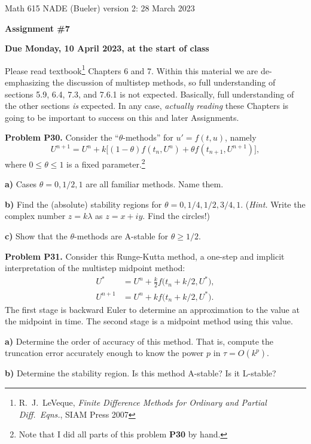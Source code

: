 \documentclass[12pt]{amsart}
\newcommand{\prob}[1]{\bigskip\noindent\textbf{#1}\quad }
\newcommand{\epart}[1]{\medskip\noindent\textbf{#1)}\quad }
\begin{document}
\scriptsize \noindent Math 615 NADE (Bueler) \hfill version 2: 28 March 2023
\normalsize

\medskip\bigskip

\Large\centerline{\textbf{Assignment \#7}}
\large
\bigskip

\centerline{\textbf{Due Monday, 10 April 2023, at the start of class}}
\bigskip
\normalsize

\thispagestyle{empty}

\bigskip
Please read textbook\footnote{R.~J.~LeVeque, \emph{Finite Difference Methods for Ordinary and Partial Diff.~Eqns.}, SIAM Press 2007} Chapters 6 and 7.  Within this material we are de-emphasizing the discussion of multistep methods, so full understanding of sections 5.9, 6.4, 7.3, and 7.6.1 is not expected.  Basically, full understanding of the other sections \emph{is} expected.  In any case, \emph{actually reading} these Chapters is going to be important to success on this and later Assignments.


\medskip
\prob{Problem P30.}  Consider the ``$\theta$-methods'' for $u' = f(t,u)$, namely
   $$U^{n+1} = U^n + k\Big[(1-\theta)f(t_n,U^n) + \theta f(t_{n+1},U^{n+1})\Big],$$
where $0\le \theta \le 1$ is a fixed parameter.\footnote{Note that I did all parts of this problem \textbf{P30} by hand.}

\epart{a} Cases $\theta = 0,1/2,1$ are all familiar methods.  Name them.

\epart{b} Find the (absolute) stability regions for $\theta = 0,1/4,1/2,3/4,1$.  (\emph{Hint.}  Write the complex number $z=k\lambda$ as $z=x+iy$.  Find the circles!)

\epart{c} Show that the $\theta$-methods are A-stable for $\theta \geq 1/2$.


\prob{Problem P31.}  Consider this Runge-Kutta method, a one-step and implicit interpretation of the multistep midpoint method:
\begin{align*}
U^* &= U^n + \frac{k}{2} f\big(t_n + k/2, U^*\big),\\
U^{n+1} &= U^n + k f\big(t_n + k/2, U^*\big).
\end{align*}
The first stage is backward Euler to determine an approximation to the value at the midpoint in time.  The second stage is a midpoint method using this value.

\epart{a}  Determine the order of accuracy of this method.  That is, compute the truncation error accurately enough to know the power $p$ in $\tau=O(k^p)$.

\epart{b}  Determine the stability region.  Is this method A-stable?  Is it L-stable?
\end{document}
